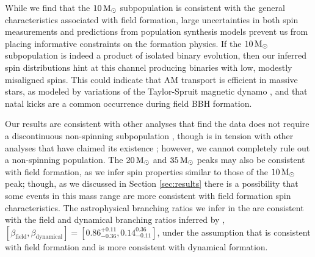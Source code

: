 
While we find that the $10{\,\rm M}_\odot$ subpopulation is consistent with the general characteristics associated with field formation, large uncertainties in both spin measurements and predictions from population synthesis models prevent us from placing informative constraints on the formation physics. If the $10{\,\rm M}_\odot$ subpopulation is indeed a product of isolated binary evolution, then our inferred spin distributions hint at this channel producing binaries with low, modestly misaligned spins. This could indicate that AM transport is efficient in massive stars, as modeled by variations of the Taylor-Spruit magnetic dynamo \citep{1706.07053}, and that natal kicks are a common occurrence during field BBH formation. 

Our results are consistent with other analyses that find the data does not require a discontinuous non-spinning subpopulation \citep{2022ApJ...937L..13C,2205.12329, 2022arXiv220902206T, 2301.01312,10.48550/arXiv.2302.07289, 2210.12287}, though is in tension with other analyses that have claimed its existence \citep{2021ApJ...921L..15G,2021PhRvD.104h3010R}; however, we cannot completely rule out a non-spinning population. The $20{\,\rm M}_\odot$ and $35{\,\rm M}_\odot$ peaks may also be consistent with field formation, as we infer spin properties similar to those of the $10{\,\rm M}_\odot$ peak; though, as we discussed in Section \ref{sec:results} there is a possibility that some events in this mass range are more consistent with field formation spin characteristics. The astrophysical branching ratios we infer in the \comp{} are consistent with the field and dynamical branching ratios inferred by \citet{2011.10057}, $[\beta_{\text{field}}, \beta_{\text{dynamical}}] = [0.86^{+0.11}_{-0.36}, 0.14^{0.36}_{-0.11}]$, under the assumption that \popA{} is consistent with field formation and \contB{} is more consistent with dynamical formation.

